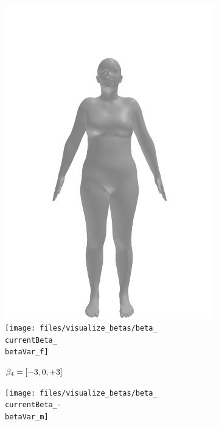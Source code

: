\begin{figure}[ht!]
\begin{subfigure}{\betaWidth}
        \includegraphics[width=\imgWidth]{files/visualize_betas/baseline_f}
        \texttt{[image: files/visualize\_betas/beta\_\\currentBeta\_\\betaVar\_f]}
        \caption{$\beta_4 = [-3, 0, +3]$}
    \end{subfigure}
    \begin{subfigure}{\betaWidth}
        \def\currentBeta{4}
        \centering
        \texttt{[image: files/visualize\_betas/beta\_\\currentBeta\_-\\betaVar\_m]}

\end{subfigure}
\end{figure}
